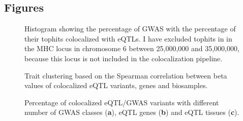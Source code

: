 \begin{backmatter}

    \section*{Figures}

%
%

    \begin{figure}[h!]
        \caption{Histogram showing the percentage of GWAS with the percentage of their tophits colocalized with eQTLs.
        I have excluded tophits in in the MHC locus in chromosome 6 between 25,000,000 and 35,000,000,
            because this locus is not included in the colocalization pipeline.}
        \label{fig:hist_perc_tophits_eqtl_excl_mhc}
    \end{figure}

%
%

    \begin{figure}[h!]
        \caption{Trait clustering based on the Spearman correlation between beta values of colocalized eQTL variants, genes and biosamples.}
        \label{fig:trait_clusters}
    \end{figure}

%
%
%
    \begin{figure}[h!]
        \caption{Percentage of colocalized eQTL/GWAS variants with different number of GWAS classes (\textbf{a}), eQTL genes
            (\textbf{b}) and eQTL tissues (\textbf{c}).} \label{fig:hist_gwas_egene_etissue}
    \end{figure}

%
%


\end{backmatter}
